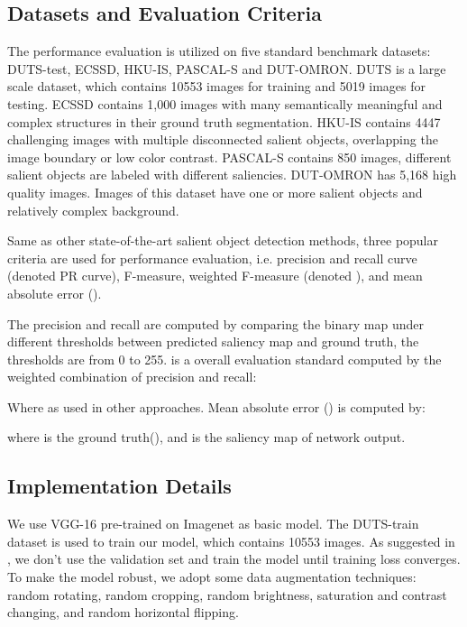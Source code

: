 \documentclass[10pt,twocolumn,letterpaper]{article}
\begin{document}
\subsection{Datasets and Evaluation Criteria}

The performance evaluation is utilized on five standard benchmark datasets: DUTS-test\cite{duts}, ECSSD\cite{ecssd}, HKU-IS\cite{hkuis}, PASCAL-S\cite{pascal} and DUT-OMRON\cite{omron}.  DUTS\cite{duts} is a large scale dataset, which contains 10553 images for training and 5019 images for testing. ECSSD \cite{ecssd} contains 1,000 images with many semantically meaningful and complex structures in their ground truth segmentation. HKU-IS \cite{hkuis} contains 4447 challenging images with multiple disconnected
salient objects, overlapping the image boundary or low color contrast. PASCAL-S \cite{pascal} contains 850 images, different salient objects are labeled with different saliencies. DUT-OMRON \cite{omron} has 5,168 high quality images. Images of this dataset have one or more salient objects and relatively complex background.


Same as other state-of-the-art salient object detection methods, three popular criteria are used for performance evaluation, i.e. precision and recall curve (denoted PR curve), F-measure, weighted F-measure (denoted ), and mean absolute error ().

The precision and recall are computed by comparing the binary map under different thresholds between predicted saliency map and ground truth, the thresholds are from 0 to 255.  is a overall evaluation standard computed by the weighted combination of precision and recall:

Where  as used in other approaches. Mean absolute error () is computed by:

where  is the ground truth(), and  is the saliency map of network output.

\subsection{Implementation Details}
We use VGG-16 pre-trained on Imagenet\cite{imagenet} as basic model. The DUTS-train dataset is used to train our model, which contains 10553 images. As suggested in \cite{dhs}, we don't use the validation set and train the model until training loss converges. To make the model robust, we adopt some data augmentation techniques: random rotating, random cropping, random brightness, saturation and contrast  changing, and random horizontal flipping.
\end{document}

